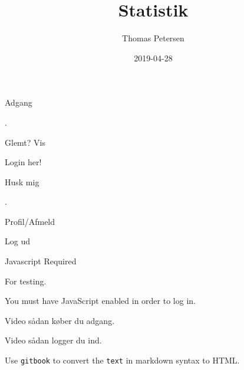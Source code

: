 \documentclass[]{book}
\title{Statistik}
\author{Thomas Petersen}
\date{2019-04-28}
\begin{document}
\maketitle

{
\setcounter{tocdepth}{1}
\tableofcontents
}
\hypertarget{section}{%
\chapter*{}\label{section}}

\hypertarget{Settings}{}

\hypertarget{TopBar}{}
\hypertarget{Sentry_label}{}
\protect\hypertarget{Sentry_label_span}{}{Adgang}\protect\hypertarget{downArrow}{}{}

\hypertarget{magicGroup}{}
\hypertarget{messages}{}
.

\leavevmode\hypertarget{Sentry_emailDiv}{}%

\hypertarget{Sentry_passwordDiv}{}
{
}

\hypertarget{Sentry_HIDpasswordDiv}{}
{
}

\hypertarget{unHideDiv}{}
\protect\hypertarget{forgotSpan}{}{Glemt?}
\protect\hypertarget{unHideSpan}{}{Vis}

\hypertarget{buttonDiv}{}
Login her!

\hypertarget{psistDiv}{}

\hypertarget{psistDiv}{}
\protect\hypertarget{psistSpan}{}{Husk mig}

\hypertarget{goInside}{}
\protect\hypertarget{goInsideSpan}{}{.}

\hypertarget{signUp}{}
\hypertarget{psistDiv}{}

\hypertarget{signUp}{}
\hypertarget{psistDiv}{}

\hypertarget{signUp}{}
Profil/Afmeld

\hypertarget{psistDiv}{}

\hypertarget{logOut}{}
{Log ud}

\hypertarget{xbox}{}

\hypertarget{Sentry_noJSLogin}{}
{Javascript Required}

\hypertarget{Sentry_loggingIn}{}

\hypertarget{Sentry_In}{}
For testing.

You must have JavaScript enabled in order to log in.

Video sådan køber du adgang.

Video sådan logger du ind.

Use \texttt{gitbook} to convert the \texttt{text} in markdown
syntax to HTML.
\end{document}
